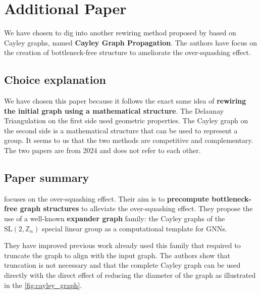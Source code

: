 \documentclass{article}
\theoremstyle{plain}
\theoremstyle{definition}
\theoremstyle{remark}
\begin{document}
\section{Additional Paper}
We have chosen to dig into another rewiring method proposed by \cite{wilson2024cayleygraphpropagation}
based on Cayley graphs, named \textbf{Cayley Graph Propagation}. 
The authors have focus on the creation of bottleneck-free
structure to ameliorate the over-squashing effect. 

\subsection{Choice explanation}
We have chosen this paper because it follows the exact same idea of \textbf{rewiring
the initial graph using a mathematical structure}. The Delaunay Triangulation
on the first side used geometric properties. The Cayley graph on the second side
is a mathematical structure that can be used to represent a group. It seems
to us that the two methods are competitive and complementary. The two papers
are from 2024 and does not refer to each other.

\subsection{Paper summary}
\cite{wilson2024cayleygraphpropagation} focuses on the over-squashing effect.
Their aim is to \textbf{precompute bottleneck-free graph structures} to alleviate the
over-squashing effect. They propose the use of a well-known \textbf{expander graph} family:
the Cayley graphs of the $\text{SL}(2,\mathbb{Z}_n)$ special linear group as a computational template for GNNs.

They have improved previous work already used this family that required to 
truncate the graph to align with the input graph. The authors show that truncation is
not necessary and that the complete Cayley graph can be used directly with 
the direct effect of reducing the diameter of the graph as illustrated in the \cref{fig:cayley_graph}.
\end{document}
